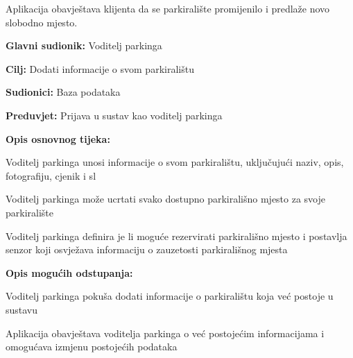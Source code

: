 {\begin{packed_item}
\begin{packed_item}
\begin{packed_enum}
			\item Aplikacija obavještava klijenta da se parkiralište promijenilo i predlaže novo slobodno mjesto.
			
		\end{packed_enum}
		
	\end{packed_item}

\end{packed_item}

\noindent {}
\begin{packed_item}
	
	\item \textbf{Glavni sudionik: }Voditelj parkinga
	\item  \textbf{Cilj:} Dodati informacije o svom parkiralištu
	\item  \textbf{Sudionici:} Baza podataka
	\item  \textbf{Preduvjet:} Prijava u sustav kao voditelj parkinga
	\item  \textbf{Opis osnovnog tijeka:}
	
	\item[] \begin{packed_enum}
		
		\item Voditelj parkinga unosi informacije o svom parkiralištu, uključujući naziv, opis, fotografiju, cjenik i sl
		\item Voditelj parkinga može ucrtati svako dostupno parkirališno mjesto za svoje parkiralište
		\item Voditelj parkinga definira je li moguće rezervirati parkirališno mjesto i postavlja senzor koji osvježava informaciju o zauzetosti parkirališnog mjesta
		
	\end{packed_enum}
	
	\item  \textbf{Opis mogućih odstupanja:}
	
	\item[] \begin{packed_item}
		
		\item[1.a] Voditelj parkinga pokuša dodati informacije o parkiralištu koja već postoje u sustavu
		\item[] \begin{packed_enum}
			
			\item Aplikacija obavještava voditelja parkinga o već postojećim informacijama i omogućava izmjenu postojećih podataka
			

\end{packed_enum}
\end{packed_item}
\end{packed_item}}

